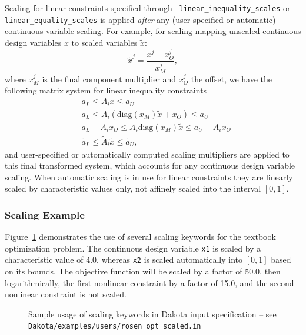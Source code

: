 Scaling for linear constraints specified through {\tt
  linear\_inequality\_scales} or {\tt linear\_equality\_scales} is
applied {\em after} any (user-specified or automatic) continuous
variable scaling. For example, for scaling mapping unscaled continuous
design variables $x$ to scaled variables $\tilde{x}$:
\[ \tilde{x}^j = \frac{x^j - x^j_O}{x^j_M}, \]
where $x^j_M$ is the final component multiplier and $x^j_O$ the
offset, we have the following matrix system for linear inequality
constraints
\begin{eqnarray*}
& a_L \leq A_i x \leq a_U \\
& a_L \leq A_i \left( \mathrm{diag}(x_M) \tilde{x} + x_O \right) \leq a_U \\
& a_L - A_i x_O \leq A_i \mathrm{diag}(x_M) \tilde{x} \leq a_U - A_i x_O \\
& \tilde{a}_L \leq \tilde{A}_i \tilde{x} \leq \tilde{a}_U,
\end{eqnarray*}
and user-specified or automatically computed scaling multipliers are
applied to this final transformed system, which accounts for any
continuous design variable scaling. When automatic scaling is in use
for linear constraints they are linearly scaled by characteristic
values only, not affinely scaled into the interval $[0,1]$.

\subsubsection{Scaling Example}
\label{opt:additional:scaling:example}

Figure~\ref{opt:additional:scaling:example:figure01} demonstrates the
use of several scaling keywords for the textbook optimization problem.
The continuous design variable {\tt x1} is scaled by a characteristic
value of 4.0, whereas {\tt x2} is scaled automatically into $[0,1]$
based on its bounds. The objective function will be scaled by a factor
of 50.0, then logarithmically, the first nonlinear constraint by a
factor of 15.0, and the second nonlinear constraint is not scaled.

\begin{figure}
\centering
\begin{bigbox}
\begin{small}
\end{small}
\end{bigbox}
\caption{Sample usage of scaling keywords in Dakota input specification --
see \texttt{Dakota/examples/users/rosen\_opt\_scaled.in} }
\label{opt:additional:scaling:example:figure01}
\end{figure}

